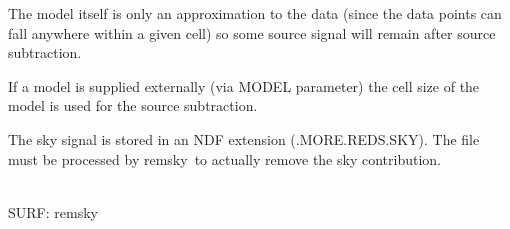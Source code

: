 \documentclass[twoside,11pt]{article}
\newcommand{\task}[1]{{\sf #1}}
\newcommand{\remsky}{\htmlref{\task{remsky}}{REMSKY}}
\newcommand{\htmlref}[2]{#1}
\renewcommand{\_}{\texttt{\symbol{95}}}
\newcommand{\sstdiytopic}[2]{\item[{\hspace{-0.35em}#1\hspace{-0.35em}:}]
\mbox{} \\[1.3ex] #2}
\newcommand{\sstitem}{\item}
\newcommand{\sstdiytopic}[2]{\item[{#1}] #2 }
\newcommand{\sstitem}{\item}
\begin{document}
{{{         \sstitem
         The model itself is only an approximation
           to the data (since the data points can fall anywhere within
           a given cell) so some source signal will remain after source
           subtraction.

         \sstitem
         If a model is supplied externally (via MODEL parameter) the
           cell size of the model is used for the source subtraction.

         \sstitem
         The sky signal is stored in an NDF extension (.MORE.REDS.SKY).
           The file must be processed by \remsky\ to actually remove the
           sky contribution.
      }
   }
   \sstdiytopic{
      Related Applications
   }{
      SURF: \remsky
   }
}



\newpage
\label{surf:chgdata}
\end{document}
